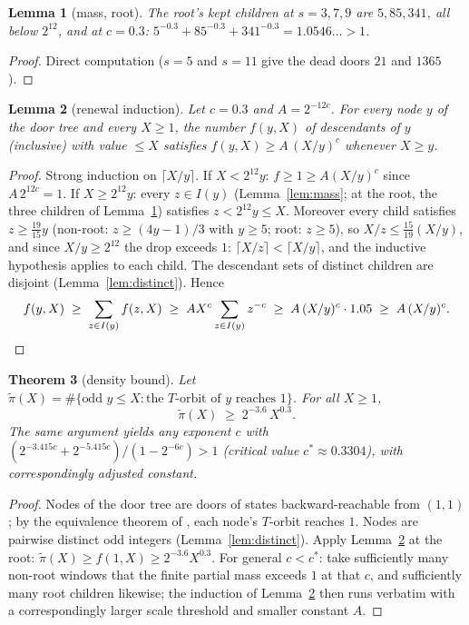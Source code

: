 \documentclass[11pt]{article}
\newtheorem{theorem}{Theorem}[section]
\newtheorem{lemma}[theorem]{Lemma}
\theoremstyle{remark}
\begin{document}
\begin{lemma}[mass, root]\label{lem:rootmass}
The root's kept children at $s = 3, 7, 9$ are $5, 85, 341$, all below $2^{12}$, and at $c = 0.3$: $5^{-0.3} + 85^{-0.3} + 341^{-0.3} = 1.0546\ldots > 1$.
\end{lemma}

\begin{proof}
Direct computation ($s = 5$ and $s = 11$ give the dead doors $21$ and $1365$).
\end{proof}

\begin{lemma}[renewal induction]\label{lem:renewal}
Let $c = 0.3$ and $A = 2^{-12c}$. For every node $y$ of the door tree and every $X \ge 1$, the number $f(y, X)$ of descendants of $y$ (inclusive) with value $\le X$ satisfies $f(y,X) \ge A\,(X/y)^c$ whenever $X \ge y$.
\end{lemma}

\begin{proof}
Strong induction on $\lceil X/y \rceil$. If $X < 2^{12} y$: $f \ge 1 \ge A(X/y)^c$ since $A\,2^{12c} = 1$. If $X \ge 2^{12}y$: every $z \in I(y)$ (Lemma~\ref{lem:mass}; at the root, the three children of Lemma~\ref{lem:rootmass}) satisfies $z < 2^{12} y \le X$. Moreover every child satisfies $z \ge \tfrac{19}{15}y$ (non-root: $z \ge (4y-1)/3$ with $y \ge 5$; root: $z \ge 5$), so $X/z \le \tfrac{15}{19}(X/y)$, and since $X/y \ge 2^{12}$ the drop exceeds $1$: $\lceil X/z \rceil < \lceil X/y \rceil$, and the inductive hypothesis applies to each child. The descendant sets of distinct children are disjoint (Lemma~\ref{lem:distinct}). Hence
\[ f(y,X) \;\ge\; \sum_{z \in I(y)} f(z, X) \;\ge\; A X^c \sum_{z\in I(y)} z^{-c} \;\ge\; A\,(X/y)^c \cdot 1.05 \;\ge\; A\,(X/y)^c. \qedhere \]
\end{proof}

\begin{theorem}[density bound]\label{thm:density}
Let $\tilde\pi(X) = \#\{\text{odd } y \le X : \text{the } T\text{-orbit of } y \text{ reaches } 1\}$. For all $X \ge 1$,
\[ \tilde\pi(X) \;\ge\; 2^{-3.6}\, X^{0.3}. \]
The same argument yields any exponent $c$ with $(2^{-3.415c} + 2^{-5.415c})/(1 - 2^{-6c}) > 1$ (critical value $c^* \approx 0.3304$), with correspondingly adjusted constant.
\end{theorem}

\begin{proof}
Nodes of the door tree are doors of states backward-reachable from $(1,1)$; by the equivalence theorem of \cite{paper1}, each node's $T$-orbit reaches $1$. Nodes are pairwise distinct odd integers (Lemma~\ref{lem:distinct}). Apply Lemma~\ref{lem:renewal} at the root: $\tilde\pi(X) \ge f(1, X) \ge 2^{-3.6}X^{0.3}$. For general $c < c^*$: take sufficiently many non-root windows that the finite partial mass exceeds $1$ at that $c$, and sufficiently many root children likewise; the induction of Lemma~\ref{lem:renewal} then runs verbatim with a correspondingly larger scale threshold and smaller constant $A$.
\end{proof}
\end{document}

